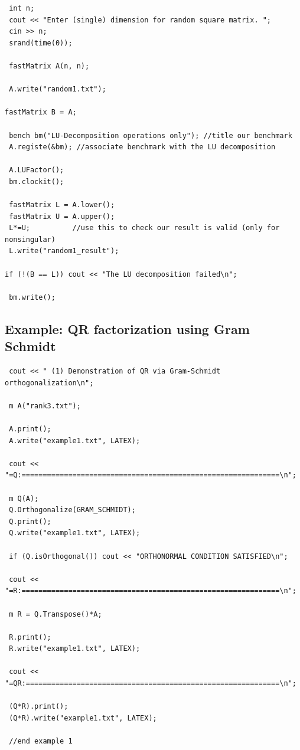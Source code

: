 \documentclass[10pt,fullpage]{article}
\begin{document}
\begin{verbatim}
 int n;
 cout << "Enter (single) dimension for random square matrix. ";
 cin >> n;
 srand(time(0));

 fastMatrix A(n, n);

 A.write("random1.txt");

fastMatrix B = A;

 bench bm("LU-Decomposition operations only"); //title our benchmark
 A.registe(&bm); //associate benchmark with the LU decomposition

 A.LUFactor();
 bm.clockit();

 fastMatrix L = A.lower();
 fastMatrix U = A.upper();
 L*=U;          //use this to check our result is valid (only for nonsingular)
 L.write("random1_result");

if (!(B == L)) cout << "The LU decomposition failed\n";

 bm.write();

\end{verbatim}


\newpage

\subsection{Example: QR factorization using Gram Schmidt}
\begin{verbatim}
 cout << " (1) Demonstration of QR via Gram-Schmidt orthogonalization\n";

 m A("rank3.txt");

 A.print();
 A.write("example1.txt", LATEX);

 cout << "=Q:=============================================================\n";

 m Q(A);
 Q.Orthogonalize(GRAM_SCHMIDT);
 Q.print();
 Q.write("example1.txt", LATEX);

 if (Q.isOrthogonal()) cout << "ORTHONORMAL CONDITION SATISFIED\n";

 cout << "=R:=============================================================\n";

 m R = Q.Transpose()*A;

 R.print();
 R.write("example1.txt", LATEX);

 cout << "=QR:============================================================\n";

 (Q*R).print();
 (Q*R).write("example1.txt", LATEX);

 //end example 1
\end{verbatim}
\end{document}
